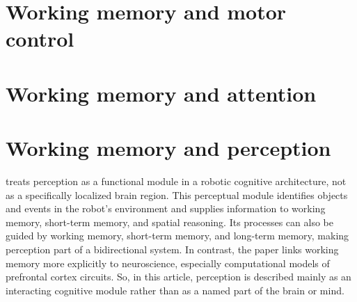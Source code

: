 \documentclass[a4paper]{article}
\begin{document}
    
    
    \section{Working memory and motor control}
        \cite{marvel-2019-how-the-motor-system-integrates-with-working-memory}
        
        \cite{mcdougle-2026-motor-working-memory}
    
    \section{Working memory and attention}
    
        \cite{oberauer-2019-working-memory-and-attention-a-conceptual-analysis-and-review}
    
    
    \section{Working memory and perception}
        \cite{wilkes-2005-working-memory-and-perception} treats perception as a functional module in a robotic cognitive architecture, not as a specifically localized brain region.
        This perceptual module identifies objects and events in the robot’s environment and supplies information to working memory, short-term memory, and spatial reasoning.
        Its processes can also be guided by working memory, short-term memory, and long-term memory, making perception part of a bidirectional system.
        In contrast, the paper links working memory more explicitly to neuroscience, especially computational models of prefrontal cortex circuits.
        So, in this article, perception is described mainly as an interacting cognitive module rather than as a named part of the brain or mind.
        
        
        
\end{document}
